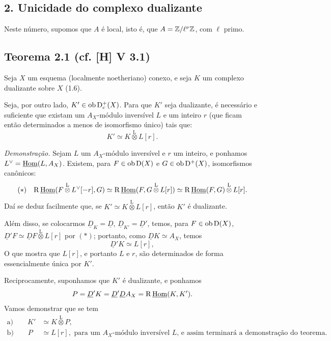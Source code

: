 \subsection*{2. Unicidade do complexo dualizante}

Neste número, supomos que $A$ é local, isto é, que $A = \mathbb{Z}/\ell^{\nu}\mathbb{Z}$, com $\ell$ primo.

\subsection*{Teorema 2.1 (cf. [H] V 3.1)}
Seja $X$ um esquema (localmente noetheriano) conexo, e seja $K$ um complexo dualizante sobre $X$ (1.6).

Seja, por outro lado, $K' \in \operatorname{ob} \mathrm{D}_c^{+}(X)$. Para que $K'$ seja dualizante, é necessário e suficiente que existam um $A_X$-módulo inversível $L$ e um inteiro $r$ (que ficam então determinados a menos de isomorfismo único) tais que:
\[
K' \simeq K \mathop{\otimes}\limits^{\mathrm{L}} L[r].
\]

\emph{Demonstração.} Sejam $L$ um $A_X$-módulo inversível e $r$ um inteiro, e ponhamos $L^{\vee} = \underline{\operatorname{Hom}}(L, A_X)$. Existem, para $F \in \operatorname{ob} \mathrm{D}(X)$ e $G \in \operatorname{ob} \mathrm{D}^{+}(X)$, isomorfismos canônicos:
\[
(*) \quad \mathrm{R}\,\underline{\operatorname{Hom}}(F \mathop{\otimes}\limits^{\mathrm{L}} L^{\vee}[-r], G) \simeq \mathrm{R}\,\underline{\operatorname{Hom}}(F, G \mathop{\otimes}\limits^{\mathrm{L}} L[r]) \simeq \mathrm{R}\,\underline{\operatorname{Hom}}(F,G) \mathop{\otimes}\limits^{\mathrm{L}} L[r].
\]
Daí se deduz facilmente que, se $K' \simeq K \mathop{\otimes}\limits^{\mathrm{L}} L[r]$, então $K'$ é dualizante.

Além disso, se colocarmos $\underline{D}_K = \underline{D}$, $\underline{D}_{K'} = \underline{D}'$, temos, para $F \in \operatorname{ob} \mathrm{D}(X)$, $\underline{D}'F \simeq \underline{D} F \mathop{\otimes}\limits^{\mathrm{L}} L[r]$ por $(*)$; portanto, como $\underline{D} K \simeq A_X$, temos
\[
\underline{D}' K \simeq L[r],
\]
O que mostra que $L[r]$, e portanto $L$ e $r$, são determinados de forma essencialmente única por $K'$.

Reciprocamente, suponhamos que $K'$ é dualizante, e ponhamos
\[
P = \underline{D}'K = \underline{D}'\underline{D} A_X = \mathrm{R}\,\underline{\operatorname{Hom}}(K,K').
\]
Vamos demonstrar que se tem
\begin{align*}
\text{a)} \qquad K' &\simeq K \mathop{\otimes}\limits^{\mathrm{L}} P, \\
\text{b)} \qquad P &\simeq L[r], \text{ para um $A_X$-módulo inversível $L$, e assim terminará a demonstração do teorema.}
\end{align*}

